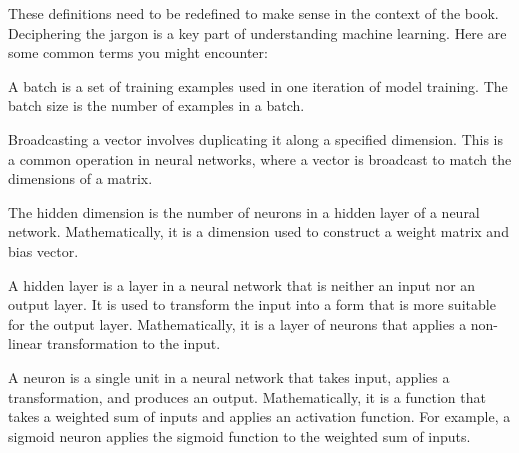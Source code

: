 %
%


These definitions need to be redefined to make sense in the context of the book. Deciphering the jargon is a key part of understanding machine learning. Here are some common terms you might encounter:

 A batch is a set of training examples used in one iteration of model training. The batch size is the number of examples in a batch.

 Broadcasting a vector involves duplicating it along a specified dimension. This is a common operation in neural networks, where a vector is broadcast to match the dimensions of a matrix.

 The hidden dimension is the number of neurons in a hidden layer of a neural network. Mathematically, it is a dimension used to construct a weight matrix and bias vector.

 A hidden layer is a layer in a neural network that is neither an input nor an output layer. It is used to transform the input into a form that is more suitable for the output layer. Mathematically, it is a layer of neurons that applies a non-linear transformation to the input.

 A neuron is a single unit in a neural network that takes input, applies a transformation, and produces an output. Mathematically, it is a function that takes a weighted sum of inputs and applies an activation function. For example, a sigmoid neuron applies the sigmoid function to the weighted sum of inputs.